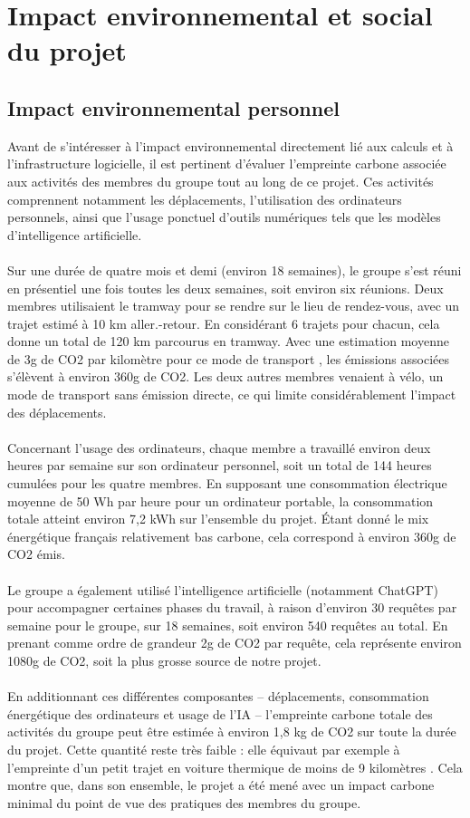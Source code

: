 \documentclass[12pt]{article}
\begin{document}
\section{Impact environnemental et social du projet}
\subsection{Impact environnemental personnel}
Avant de s'intéresser à l’impact environnemental directement lié aux calculs et à l’infrastructure logicielle, il est pertinent d’évaluer l’empreinte carbone associée aux activités des membres du groupe tout au long de ce projet. Ces activités comprennent notamment les déplacements, l’utilisation des ordinateurs personnels, ainsi que l’usage ponctuel d’outils numériques tels que les modèles d’intelligence artificielle.\\
\\
Sur une durée de quatre mois et demi (environ 18 semaines), le groupe s’est réuni en présentiel une fois toutes les deux semaines, soit environ six réunions. Deux membres utilisaient le tramway pour se rendre sur le lieu de rendez-vous, avec un trajet estimé à 10 km aller.-retour. En considérant 6 trajets pour chacun, cela donne un total de 120 km parcourus en tramway. Avec une estimation moyenne de 3g de CO2 par kilomètre pour ce mode de transport \cite{ADEME}, les émissions associées s’élèvent à environ 360g de CO2. Les deux autres membres venaient à vélo, un mode de transport sans émission directe, ce qui limite considérablement l’impact des déplacements.\\
\\
Concernant l’usage des ordinateurs, chaque membre a travaillé environ deux heures par semaine sur son ordinateur personnel, soit un total de 144 heures cumulées pour les quatre membres. En supposant une consommation électrique moyenne de 50 Wh par heure pour un ordinateur portable, la consommation totale atteint environ 7,2 kWh sur l’ensemble du projet. Étant donné le mix énergétique français relativement bas carbone, cela correspond à environ 360g de CO2 émis.\\
\\
Le groupe a également utilisé l’intelligence artificielle (notamment ChatGPT) pour accompagner certaines phases du travail, à raison d’environ 30 requêtes par semaine pour le groupe, sur 18 semaines, soit environ 540 requêtes au total. En prenant comme ordre de grandeur 2g de CO2 par requête, cela représente environ 1080g de CO2, soit la plus grosse source de notre projet.\\
\\
En additionnant ces différentes composantes – déplacements, consommation énergétique des ordinateurs et usage de l’IA – l’empreinte carbone totale des activités du groupe peut être estimée à environ 1,8 kg de CO2 sur toute la durée du projet. Cette quantité reste très faible : elle équivaut par exemple à l’empreinte d’un petit trajet en voiture thermique de moins de 9 kilomètres \cite{ADEME}. Cela montre que, dans son ensemble, le projet a été mené avec un impact carbone minimal du point de vue des pratiques des membres du groupe.
\end{document}
